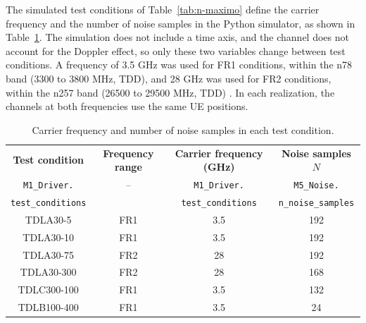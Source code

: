 
The simulated test conditions of Table~\ref{tab:n-maximo} define the carrier frequency and the number of noise samples in the Python simulator, as shown in Table~\ref{tab:condicoes_teste}. The simulation does not include a time axis, and the channel does not account for the Doppler effect, so only these two variables change between test conditions. A frequency of 3.5 GHz was used for FR1 conditions, within the n78 band (3300 to 3800 MHz, TDD), and 28 GHz was used for FR2 conditions, within the n257 band (26500 to 29500 MHz, TDD) \cite[Tabs.~5.2-1 and 5.2-2]{3gpp-ts38104}. In each realization, the channels at both frequencies use the same UE positions. %


\begin{table}[htbp]
\caption{Carrier frequency and number of noise samples in each test condition.}
\label{tab:condicoes_teste}
\vspace{4pt} %
\centering
\footnotesize
\renewcommand{\arraystretch}{1.2}
\begin{tabular}{cccc}
\toprule
\textbf{Test condition} & \textbf{Frequency range} & \textbf{Carrier frequency (GHz)} & \textbf{Noise samples {\boldmath $N$}} \\
\texttt{M1\_Driver.} & -- & \texttt{M1\_Driver.} & \texttt{M5\_Noise.} \\
\texttt{test\_conditions} & & \texttt{test\_conditions} & \texttt{n\_noise\_samples} \\
\midrule
TDLA30-5 & FR1 & 3.5 & 192 \\
TDLA30-10 & FR1 & 3.5 & 192 \\
TDLA30-75 & FR2 & 28 & 192 \\
TDLA30-300 & FR2 & 28 & 168 \\
TDLC300-100 & FR1 & 3.5 & 132 \\
TDLB100-400 & FR1 & 3.5 & 24 \\
\bottomrule
\end{tabular}

\vspace{4pt}
\end{table}


